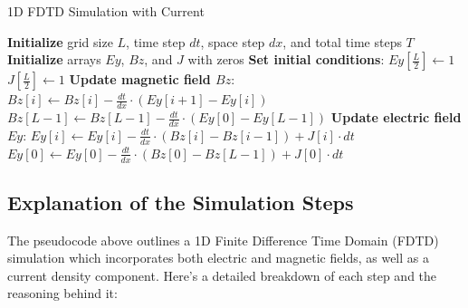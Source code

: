 \documentclass{article}[a4paper]
\begin{document}
\begin{algorithm}[H]
    \caption{1D FDTD Simulation with Current}
    \begin{algorithmic}[1]
    \State \textbf{Initialize} grid size $L$, time step $dt$, space step $dx$, and total time steps $T$
    \State \textbf{Initialize} arrays $Ey$, $Bz$, and $J$ with zeros
    \State \textbf{Set initial conditions}:
    \State $Ey[\frac{L}{2}] \gets 1$ 
    \State $J[\frac{L}{2}] \gets 1$ 
        \State \textbf{Update magnetic field $Bz$}:
            \State $Bz[i] \gets Bz[i] - \frac{dt}{dx} \cdot (Ey[i+1] - Ey[i])$
        \EndFor
        \State $Bz[L-1] \gets Bz[L-1] - \frac{dt}{dx} \cdot (Ey[0] - Ey[L-1])$ 
        \State \textbf{Update electric field $Ey$}:
            \State $Ey[i] \gets Ey[i] - \frac{dt}{dx} \cdot (Bz[i] - Bz[i-1]) + J[i] \cdot dt$
        \EndFor
        \State $Ey[0] \gets Ey[0] - \frac{dt}{dx} \cdot (Bz[0] - Bz[L-1]) + J[0] \cdot dt$ 
    \EndFor
    \end{algorithmic}
\end{algorithm}

\subsection{Explanation of the Simulation Steps}

The pseudocode above outlines a 1D Finite Difference Time Domain (FDTD) simulation which incorporates both electric and magnetic fields, as well as a current density component. Here's a detailed breakdown of each step and the reasoning behind it:
\end{document}
